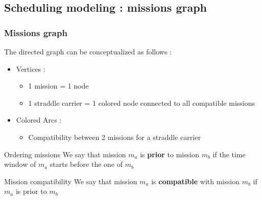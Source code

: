 \documentclass{beamer}
\begin{document}
\subsection*{Scheduling modeling : missions graph}
\begin{frame}
\frametitle{Missions graph}
	The directed graph can be conceptualized as follows :
		\begin{itemize}
	 		\item Vertices : 
				\begin{itemize}
 					\item 1 mission = 1 node
					\item 1 straddle carrier = 1 colored node connected to all compatible missions
				\end{itemize}
 
			\item Colored Arcs :
				\begin{itemize}
					\item Compatibility between 2 missions for a straddle carrier
				\end{itemize}
		\end{itemize}

	\begin{block}{Ordering missions}
		We say that mission $m_a$ is \textbf{prior} to mission $m_b$ if the time window of $m_a$ starts before the one of $m_b$
	\end{block}

	\begin{block}{Mission compatibility}
		We say that mission $m_a$ is \textbf{compatible} with mission $m_b$ if $m_a$ is prior to $m_b$
	\end{block}

\end{frame}
\end{document}

